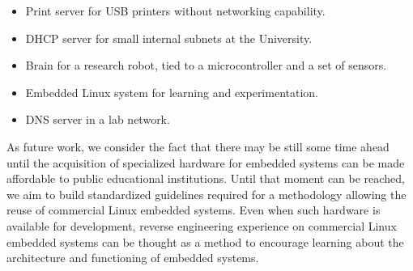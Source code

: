 \documentclass[conference]{IEEEtran}
\newcommand{\nota}[1]{}
\begin{document}
\nota{
\begin{itemize}
\item Como servidor de impresión para impresoras USB sin conexiones de red.
\item Como servidor DHCP en pequeñas redes internas de la Universidad.
\item Como cerebro de un robot experimental, que se comunica con 
un microcontrolador y sensores.
\item Como sistema Linux embebido para aprendizaje y experimentación.
\item Y como un servidor DNS experimental.
\end{itemize}
}

\begin{itemize}
\item Print server for USB printers without networking capability. 
\item DHCP server for small internal subnets at the University. 
\item Brain for a research robot, tied to a microcontroller and a set of sensors. 
\item Embedded Linux system for learning and experimentation.  
\item DNS server in a lab network.  
\end{itemize}

\nota{
Como trabajo futuro, se espera repetir la experiencia \cite{gpl}
en futuros sistemas Linux embebidos comerciales, para estandarizar
las tareas necesarias en una metodología, y hasta que la
posibilidad de adquirir hardware especializado para desarrollos
de sistemas Linux embebidos sea mucho mas accesible para
las instituciones publicas. En cuyo caso, la experiencia
de ingeniería inversa se puede mantener sobre productos comerciales,
como una manera de incentivar el aprendizaje del funcionamiento
y la arquitectura de los sistemas embebidos.
}

As future work, we consider the fact that there may be still some time ahead until the acquisition of specialized hardware for embedded systems can be made affordable to public educational institutions. Until that moment can be reached, we aim to build standardized guidelines required for a methodology allowing the reuse of commercial Linux embedded systems. Even when such hardware is available  for development, reverse engineering 
experience on commercial Linux embedded systems can be thought as 
a method to encourage learning about the architecture and functioning of embedded systems. 
\end{document}
